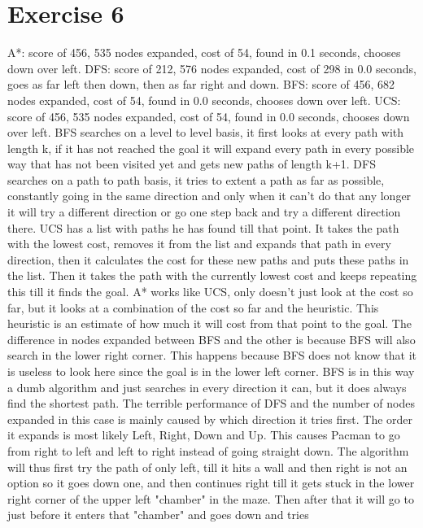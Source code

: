\section{Exercise 6}
A*:  score of 456, 535 nodes expanded, cost of 54, found in 0.1 seconds, chooses down over left.
DFS: score of 212, 576 nodes expanded, cost of 298 in 0.0 seconds, goes as far left then down, then as far right and down.
BFS: score of 456, 682 nodes expanded, cost of 54, found in 0.0 seconds, chooses down over left.
UCS: score of 456, 535 nodes expanded, cost of 54, found in 0.0 seconds, chooses down over left.
BFS searches on a level to level basis, it first looks at every path with length k, if it has not reached the goal 
it will expand every path in every possible way that has not been visited yet and gets new paths of length k+1.
DFS searches on a path to path basis, it tries to extent a path as far as possible, constantly going in the same direction
and only when it can't do that any longer it will try a different direction or go one step back and try a different direction there.
UCS has a list with paths he has found till that point. It takes the path with the lowest cost, removes it from the list 
and expands that path in every direction, then it calculates the cost for these new paths and puts these paths in the list. 
Then it takes the path with the currently lowest cost and keeps repeating this till it finds the goal.
A* works like UCS, only doesn't just look at the cost so far, but it looks at a combination of the cost so far and the heuristic.
This heuristic is an estimate of how much it will cost from that point to the goal.
The difference in nodes expanded between BFS and the other is because BFS will also search in the lower right corner. 
This happens because BFS does not know that it is useless to look here since the goal is in the lower left corner.
BFS is in this way a dumb algorithm and just searches in every direction it can, but it does always find the shortest path.
The terrible performance of DFS and the number of nodes expanded in this case is mainly caused by which direction it tries first. 
The order it expands is most likely Left, Right, Down and Up. This causes Pacman to go from right to left and left to right instead of going straight down. The algorithm will thus first try the path of only left, till it hits a wall and then right 
is not an option so it goes down one, and then continues right till it gets stuck in the lower right corner of the upper left "chamber"
in the maze. Then after that it will go to just before it enters that "chamber" and goes down and tries 
